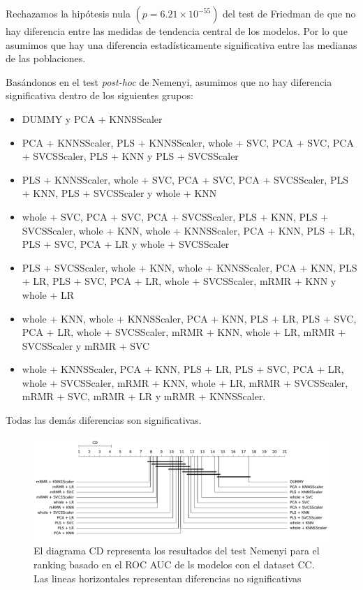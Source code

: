 \documentclass[a4paper,oneside,11pt,leqno]{article}
\begin{document}
	Rechazamos la hipótesis nula $(p=6.21\times 10^{-55})$ del test de Friedman de que no hay diferencia entre las medidas de tendencia central de los modelos. Por lo que asumimos que hay una diferencia estadísticamente significativa entre las medianas de las poblaciones.

	Basándonos en el test \textit{post-hoc} de Nemenyi, asumimos que no hay diferencia significativa dentro de los siguientes grupos:

	\begin{itemize}
		\item DUMMY y PCA + KNNSScaler

		\item PCA + KNNSScaler, PLS + KNNSScaler, whole + SVC, PCA + SVC, PCA + SVCSScaler, PLS + KNN y PLS + SVCSScaler

		\item PLS + KNNSScaler, whole + SVC, PCA + SVC, PCA + SVCSScaler, PLS + KNN, PLS + SVCSScaler y whole + KNN

		\item whole + SVC, PCA + SVC, PCA + SVCSScaler, PLS + KNN, PLS + SVCSScaler, whole + KNN, whole + KNNSScaler, PCA + KNN, PLS + LR, PLS + SVC, PCA + LR y whole + SVCSScaler

		\item  PLS + SVCSScaler, whole + KNN, whole + KNNSScaler, PCA + KNN, PLS + LR, PLS + SVC, PCA + LR, whole + SVCSScaler, mRMR + KNN y whole + LR

		\item  whole + KNN, whole + KNNSScaler, PCA + KNN, PLS + LR, PLS + SVC, PCA + LR, whole + SVCSScaler, mRMR + KNN, whole + LR, mRMR + SVCSScaler y mRMR + SVC

		\item  whole + KNNSScaler, PCA + KNN, PLS + LR, PLS + SVC, PCA + LR, whole + SVCSScaler, mRMR + KNN, whole + LR, mRMR + SVCSScaler, mRMR + SVC, mRMR + LR y mRMR + KNNSScaler.
	\end{itemize}

	Todas las demás diferencias son significativas.

	\begin{figure}[h]
		\includegraphics[width=\linewidth]{stat_results_cc.pdf}
		\caption{El diagrama CD representa los resultados del test Nemenyi para el ranking basado en el ROC AUC de ls modelos con el dataset CC. Las lineas horizontales representan diferencias no significativas}
		\label{fig:stats_fig_cc}
	\end{figure}
\end{document}
